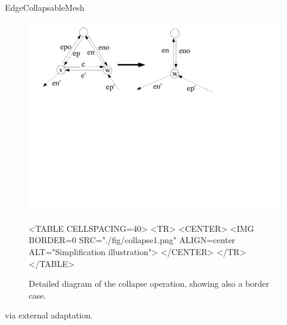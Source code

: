 \begin{ccRefConcept}{EdgeCollapsableMesh}
\begin{figure}[htbp]
\begin{ccTexOnly}
\begin{center}
\includegraphics[width=17cm]{Surface_mesh_simplification_ref/fig/collapse1} %
\end{center}
\end{ccTexOnly}
\begin{ccHtmlOnly}
<TABLE CELLSPACING=40>
<TR>
<CENTER>
<IMG BORDER=0 SRC="./fig/collapse1.png" ALIGN=center ALT="Simplification illustration">
</CENTER>
</TR>
</TABLE>
\end{ccHtmlOnly}
\caption{Detailed diagram of the collapse operation, showing also a border case.}
\end{figure}
\ccHasModels
{} via external adaptation.

\ccSeeAlso
{}\\

\end{ccRefConcept}

% 